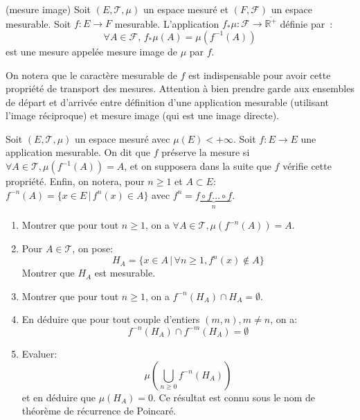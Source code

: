 \begin{mandatory}
\begin{prop}{(mesure image)}
Soit $(E, \mathcal{T}, \mu)$ un espace mesuré et $(F, \mathcal{F})$ un
espace mesurable. Soit $f : E \to F$ mesurable. L'application $f_* \mu
: \mathcal{F} \to \overline{\mathbb{R}^+}$ définie par~:
\[
\forall A \in \mathcal{F}, \, f_* \mu (A) = \mu(f^{-1}(A))
\]
est une mesure appelée mesure image de $\mu$ par $f$.
\end{prop}
\end{mandatory}
On notera que le caractère mesurable de $f$ est indispensable pour avoir cette
propriété de transport des mesures. Attention à bien prendre garde aux ensembles
de départ et d'arrivée entre définition d'une application mesurable (utilisant
l'image réciproque) et mesure image (qui est une image directe).
\begin{exercice}
Soit $(E,\mathcal{T},\mu)$ un espace mesuré avec $\mu(E)<+\infty$.
 Soit $f\colon E \to E$ une application mesurable. 
 On dit que $f$ préserve la mesure si $\forall A \in \mathcal{T}, \mu(f^{-1}(A))=A$, et on supposera dans la suite
  que $f$ vérifie cette propriété.
Enfin, on notera, pour $n \geq 1$ et $A \subset E$: $f^{-n}(A)=\{x \in E \, | \, f^n(x)\in A\}$  
avec $f^n=\underbrace{f \circ f \dots \circ f}_n$.
\begin{enumerate}
\item Montrer que pour tout $n \geq 1$, on a $\forall A \in  \mathcal{T}, \mu(f^{-n}(A))=A$.
\item Pour $A \in \mathcal{T}$, on pose:
\[
H_A = \{ x \in A \, | \, \forall n \geq 1, f^n(x) \notin A \}
\]
Montrer que $H_A$ est mesurable.
\item Montrer que pour tout $n \geq 1$, on a $f^{-n}(H_A) \cap H_A = \emptyset$.
\item En déduire que pour tout couple d'entiers $(m,n), m \neq n$, on a:
\[
f^{-n}(H_A) \cap f^{-m}(H_A)= \emptyset
\]
\item Evaluer:
\[
\mu \left( \bigcup_{n \geq 0} f^{-n}(H_A) \right)
\]
et en déduire que $\mu(H_A)=0$. Ce résultat est connu sous le nom de théorème de récurrence de Poincaré.
\end{enumerate}
\end{exercice}

